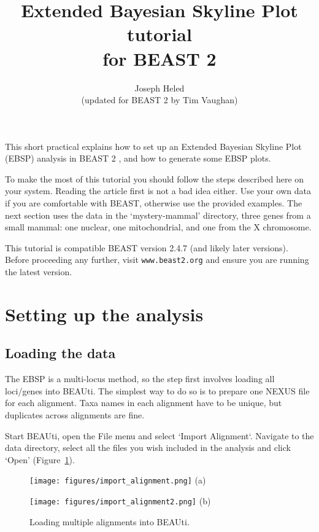 \documentclass[a4paper,11pt]{article}
\title{Extended Bayesian Skyline Plot tutorial\\for BEAST 2}
\author{Joseph Heled\\(updated for BEAST 2 by Tim Vaughan)}
\date{}
\begin{document}
\maketitle

This short practical explains how to set up an Extended Bayesian Skyline Plot
(EBSP) analysis in BEAST 2 \citep{Bouckaert2014}, and how to generate some EBSP
plots.

To make the most of this tutorial you should follow the steps described here on
your system. Reading the article \citep{Heled2008} first is not a bad idea
either. Use your own data if you are comfortable with BEAST, otherwise use the
provided examples.  The next section uses the data in the `mystery-mammal'
directory, three genes from a small mammal: one nuclear, one mitochondrial, and
one from the X chromosome.

This tutorial is compatible BEAST version 2.4.7 (and likely later
versions). Before proceeding any further, visit
\texttt{www.beast2.org} and ensure you are running the latest version.

\section{Setting up the analysis}

\subsection{Loading the data}

The EBSP is a multi-locus method, so the step first involves loading all
loci/genes into BEAUti. The simplest way to do so is to prepare one NEXUS file
for each alignment. Taxa names in each alignment have to be unique, but
duplicates across alignments are fine.

Start BEAUti, open the File menu and select `Import Alignment`.  Navigate to
the data directory, select all the files you wish included in the analysis and
click `Open' (Figure~\ref{fig:importAlignment}).

\begin{figure}[h!]
    \centering
    \hspace{-0.5cm}\begin{minipage}[b]{0.4\textwidth}
        \begin{center}
            \texttt{[image: figures/import\_alignment.png]}
            (a)
        \end{center}
    \end{minipage}\hspace{0.5cm}\begin{minipage}[b]{0.6\textwidth}
        \begin{center}
            \texttt{[image: figures/import\_alignment2.png]}
            (b)
        \end{center}
    \end{minipage}
    \caption{Loading multiple alignments into BEAUti.}
\label{fig:importAlignment}
\end{figure}
\end{document}
